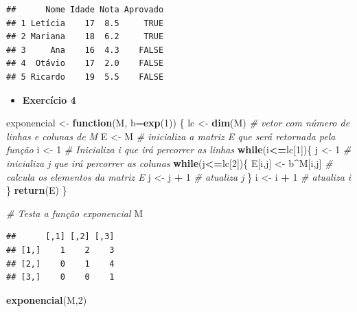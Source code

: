 \documentclass[
]{book}
\newenvironment{Shaded}{\begin{snugshade}}{\end{snugshade}}
\newcommand{\AttributeTok}[1]{\textcolor[rgb]{0.13,0.29,0.53}{#1}}
\newcommand{\CommentTok}[1]{\textcolor[rgb]{0.56,0.35,0.01}{\textit{#1}}}
\newcommand{\ControlFlowTok}[1]{\textcolor[rgb]{0.13,0.29,0.53}{\textbf{#1}}}
\newcommand{\DecValTok}[1]{\textcolor[rgb]{0.00,0.00,0.81}{#1}}
\newcommand{\FunctionTok}[1]{\textcolor[rgb]{0.13,0.29,0.53}{\textbf{#1}}}
\newcommand{\NormalTok}[1]{#1}
\newcommand{\OtherTok}[1]{\textcolor[rgb]{0.56,0.35,0.01}{#1}}
\newcommand{\SpecialCharTok}[1]{\textcolor[rgb]{0.81,0.36,0.00}{\textbf{#1}}}
\providecommand{\tightlist}{%
  \setlength{\itemsep}{0pt}\setlength{\parskip}{0pt}}
\begin{document}
\begin{verbatim}
##      Nome Idade Nota Aprovado
## 1 Letícia    17  8.5     TRUE
## 2 Mariana    18  6.2     TRUE
## 3     Ana    16  4.3    FALSE
## 4  Otávio    17  2.0    FALSE
## 5 Ricardo    19  5.5    FALSE
\end{verbatim}

\begin{itemize}
\tightlist
\item
  \textbf{Exercício 4}
\end{itemize}

\begin{Shaded}
\begin{Highlighting}[]
\NormalTok{exponencial }\OtherTok{\textless{}{-}} \ControlFlowTok{function}\NormalTok{(M, }\AttributeTok{b=}\FunctionTok{exp}\NormalTok{(}\DecValTok{1}\NormalTok{)) \{}
\NormalTok{  lc }\OtherTok{\textless{}{-}} \FunctionTok{dim}\NormalTok{(M) }\CommentTok{\# vetor com número de linhas e colunas de M}
\NormalTok{  E }\OtherTok{\textless{}{-}}\NormalTok{ M }\CommentTok{\# inicializa a matriz E que será retornada pela função}
\NormalTok{  i }\OtherTok{\textless{}{-}} \DecValTok{1} \CommentTok{\# Inicializa i que irá percorrer as linhas}
  \ControlFlowTok{while}\NormalTok{(i}\SpecialCharTok{\textless{}=}\NormalTok{lc[}\DecValTok{1}\NormalTok{])\{}
\NormalTok{    j }\OtherTok{\textless{}{-}} \DecValTok{1} \CommentTok{\# inicializa j que irá percorrer as colunas}
    \ControlFlowTok{while}\NormalTok{(j}\SpecialCharTok{\textless{}=}\NormalTok{lc[}\DecValTok{2}\NormalTok{])\{}
\NormalTok{      E[i,j] }\OtherTok{\textless{}{-}}\NormalTok{ b}\SpecialCharTok{\^{}}\NormalTok{M[i,j] }\CommentTok{\# calcula os elementos da matriz E}
\NormalTok{      j }\OtherTok{\textless{}{-}}\NormalTok{ j }\SpecialCharTok{+} \DecValTok{1} \CommentTok{\# atualiza j}
\NormalTok{    \}}
\NormalTok{    i }\OtherTok{\textless{}{-}}\NormalTok{ i }\SpecialCharTok{+} \DecValTok{1} \CommentTok{\# atualiza i}
\NormalTok{  \}}
  \FunctionTok{return}\NormalTok{(E)}
\NormalTok{\}}

\CommentTok{\# Testa a função \textquotesingle{}exponencial\textquotesingle{}}
\NormalTok{M}
\end{Highlighting}
\end{Shaded}

\begin{verbatim}
##      [,1] [,2] [,3]
## [1,]    1    2    3
## [2,]    0    1    4
## [3,]    0    0    1
\end{verbatim}

\begin{Shaded}
\begin{Highlighting}[]
\FunctionTok{exponencial}\NormalTok{(M,}\DecValTok{2}\NormalTok{)  }
\end{Highlighting}
\end{Shaded}
\end{document}
